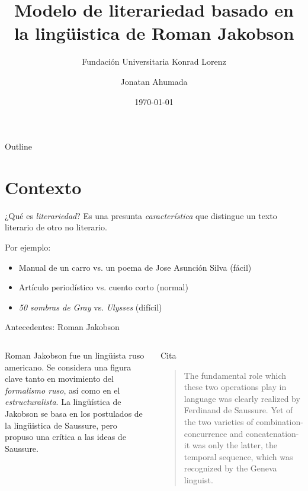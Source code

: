 \documentclass[presentation]{beamer}
\author{Jonatan Ahumada}
\date{\today}
\title{Modelo de literariedad basado en la lingüistica de Roman Jakobson}
\subtitle{Fundación Universitaria Konrad Lorenz}
\begin{document}
\maketitle
\begin{frame}{Outline}
\tableofcontents
\end{frame}



\section{Contexto}
\label{sec:org0ba0593}

\begin{frame}[label={sec:orgc349bad}]{¿Qué es \emph{literariedad}?}
Es una presunta \emph{característica} que distingue un texto literario de
otro no literario.

Por ejemplo:

\begin{itemize}
\item Manual de un carro vs. un poema de Jose Asunción Silva (fácil)
\item Artículo periodístico  vs. cuento corto  (normal)
\item \emph{50 sombras de Gray} vs. \emph{Ulysses} (difícil)
\end{itemize}
\end{frame}





\begin{frame}[label={sec:org1cece3e}]{Antecedentes: Roman Jakobson}
\begin{columns}
\begin{column}{0.48\columnwidth}
Roman Jakobson fue un lingüista ruso americano. Se considera una
figura clave tanto en movimiento del \emph{formalismo ruso}, así como
en el \emph{estructuralista}.  La lingüística de Jakobson se basa en
los postulados de la lingüistica de Saussure, \alert{pero} propuso una
crítica a las ideas de Saussure.
\end{column}


\begin{column}{0.48\columnwidth}
\begin{block}{Cita}
\begin{quote}
The fundamental role which these two operations play in language
was clearly realized by Ferdinand de Saussure. Yet of the two
varieties of combination-concurrence and concatenation-it was only
the latter, the temporal sequence, which was recognized by the
Geneva linguist. 
\cite[p. 99]{jakobson1956two}
\end{quote}
\end{block}
\end{column}
\end{columns}
\end{frame}
\end{document}
